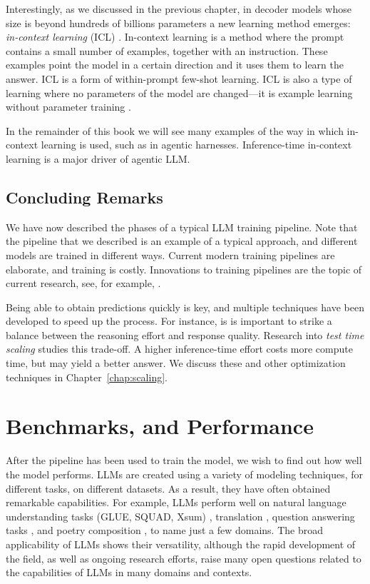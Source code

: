Interestingly, as we discussed in the previous chapter, in decoder models whose size is beyond hundreds of billions parameters a new learning method emerges: {\em in-context learning} (ICL) \citep{brown2020language,wei2022emergent}. In-context learning is a method where the prompt contains a small number of examples, together with an instruction. These examples point the model in a certain direction and it uses them to learn the answer. ICL is a form of within-prompt few-shot learning.  ICL is also a type of learning where no parameters of the model are changed---it is example learning without parameter training \citep{dong2022survey}. %

In the remainder of this book we will see many examples of the way in which in-context learning is used, such as in  agentic harnesses. Inference-time in-context learning is a major driver of agentic LLM. 

\subsection{Concluding Remarks}
We have now described the phases of a typical LLM training pipeline. 
Note that the  pipeline that we described is an example of a typical approach, and different models are trained in different ways. Current modern training pipelines are elaborate, and training is costly. Innovations to training pipelines are the topic of current research, see, for example, \citet{guo2025deepseek,team2025kimi}.

Being able to obtain predictions quickly is key, and multiple techniques have been developed to speed up the process. For instance, is is important to strike a balance between the reasoning effort and response quality. Research into  {\em test time scaling} studies this trade-off. A higher inference-time effort costs more compute time, but may yield a better answer. We discuss these and other optimization techniques in Chapter~\ref{chap:scaling}.


\section{Benchmarks, and Performance}
\label{sec:pipeline-benchmarks}
After the pipeline has been used to train the model, we wish to find out how well the model performs. 
LLMs are created using a variety of modeling techniques, for different tasks, on different datasets. As a result, they have often obtained remarkable  capabilities. For example, LLMs perform well on natural language understanding tasks (GLUE, SQUAD, Xsum) \citep{wang2018glue,wang2019superglue,rajpurkar2016squad,narayan2018don}, translation \citep{kocmi2022findings,papineni2002bleu,sennrich2015improving}, question answering tasks \citep{roberts2020much}, and poetry composition \citep{zhang2024llm}, to name just a few domains. The broad applicability of LLMs shows their versatility, although the rapid development of the field, as well as ongoing research efforts, raise many open questions related to the capabilities of LLMs in many domains and contexts. 

